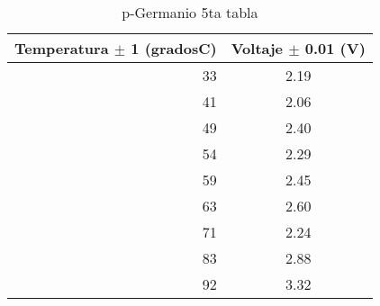 \documentclass[aps,prl,reprint]{revtex4-1}
\begin{document}
\begin{table}[H]
\begin{center}
\begin{tabular}
{|| r || c ||} 
\hline\hline
Temperatura $\pm$ 1 (gradosC) & Voltaje $\pm$ 0.01 (V)\\

\hline

33 & 2.19\\ 
41 & 2.06\\
49 & 2.40\\
54 & 2.29\\
59 & 2.45\\
63 & 2.60\\
71 & 2.24\\
83 & 2.88 \\
92 & 3.32\\


\hline\hline
\end{tabular}
\end{center}
\caption{p-Germanio 5ta tabla}
\label{5p}
\end{table}

\begin{thebibliography}{99} 

\end{thebibliography}
\end{document}
